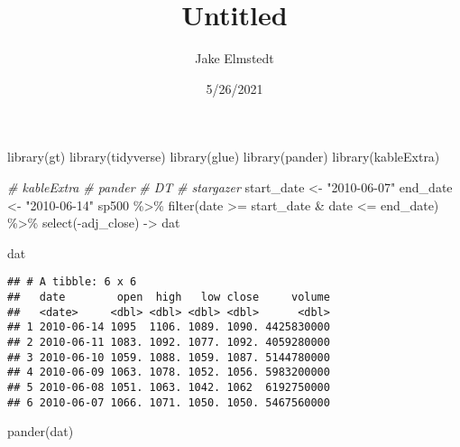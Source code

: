 \documentclass[
]{article}
\title{Untitled}
\author{Jake Elmstedt}
\date{5/26/2021}
\newenvironment{Shaded}{\begin{snugshade}}{\end{snugshade}}
\newcommand{\CommentTok}[1]{\textcolor[rgb]{0.56,0.35,0.01}{\textit{#1}}}
\newcommand{\FunctionTok}[1]{\textcolor[rgb]{0.00,0.00,0.00}{#1}}
\newcommand{\NormalTok}[1]{#1}
\newcommand{\OtherTok}[1]{\textcolor[rgb]{0.56,0.35,0.01}{#1}}
\newcommand{\SpecialCharTok}[1]{\textcolor[rgb]{0.00,0.00,0.00}{#1}}
\newcommand{\StringTok}[1]{\textcolor[rgb]{0.31,0.60,0.02}{#1}}
\begin{document}
\maketitle

\begin{Shaded}
\begin{Highlighting}[]
\FunctionTok{library}\NormalTok{(gt)}
\FunctionTok{library}\NormalTok{(tidyverse)}
\FunctionTok{library}\NormalTok{(glue)}
\FunctionTok{library}\NormalTok{(pander)}
\FunctionTok{library}\NormalTok{(kableExtra)}
\end{Highlighting}
\end{Shaded}

\begin{Shaded}
\begin{Highlighting}[]
\CommentTok{\# kableExtra}
\CommentTok{\# pander}
\CommentTok{\# DT}
\CommentTok{\# stargazer}
\NormalTok{start\_date }\OtherTok{\textless{}{-}} \StringTok{"2010{-}06{-}07"}
\NormalTok{end\_date }\OtherTok{\textless{}{-}} \StringTok{"2010{-}06{-}14"}
\NormalTok{sp500 }\SpecialCharTok{\%\textgreater{}\%}
  \FunctionTok{filter}\NormalTok{(date }\SpecialCharTok{\textgreater{}=}\NormalTok{ start\_date }\SpecialCharTok{\&}\NormalTok{ date }\SpecialCharTok{\textless{}=}\NormalTok{ end\_date) }\SpecialCharTok{\%\textgreater{}\%}
  \FunctionTok{select}\NormalTok{(}\SpecialCharTok{{-}}\NormalTok{adj\_close) }\OtherTok{{-}\textgreater{}}
\NormalTok{  dat}

\NormalTok{dat}
\end{Highlighting}
\end{Shaded}

\begin{verbatim}
## # A tibble: 6 x 6
##   date        open  high   low close     volume
##   <date>     <dbl> <dbl> <dbl> <dbl>      <dbl>
## 1 2010-06-14 1095  1106. 1089. 1090. 4425830000
## 2 2010-06-11 1083. 1092. 1077. 1092. 4059280000
## 3 2010-06-10 1059. 1088. 1059. 1087. 5144780000
## 4 2010-06-09 1063. 1078. 1052. 1056. 5983200000
## 5 2010-06-08 1051. 1063. 1042. 1062  6192750000
## 6 2010-06-07 1066. 1071. 1050. 1050. 5467560000
\end{verbatim}

\begin{Shaded}
\begin{Highlighting}[]
\FunctionTok{pander}\NormalTok{(dat)}
\end{Highlighting}
\end{Shaded}
\end{document}
